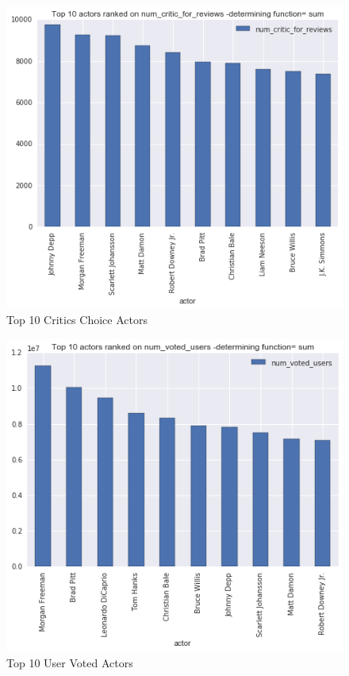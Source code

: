 \documentclass{article}%
\begin{document}
\begin{figure}
\centering
\includegraphics[width=1.0\columnwidth]{Fig/Top10actorbasedonnumcriticforreviews.png}
\caption{Top 10 Critics Choice Actors}
\label{fig:Top 10 actor based on numcriticforreviews}
\end{figure}

\begin{figure}
\centering
\includegraphics[width=1.0\columnwidth]{Fig/Top10actorsbasedonnumvotedusers.png}
\caption{Top 10 User Voted Actors}
\label{fig:Top10actorsbasedonnumvotedusers}
\end{figure}
\end{document}
